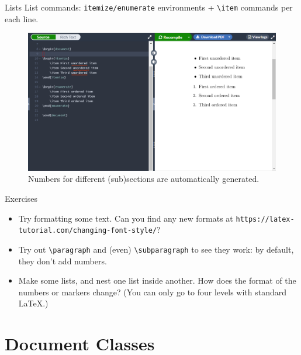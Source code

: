 \documentclass{beamer}
\begin{document}
{  \begin{frame}{Lists}
    List commands: \texttt{itemize/enumerate} environments + \texttt{\textbackslash item} commands per each line.
    \begin{figure}
      \includegraphics[width=0.9\linewidth]{day01-overleaf-06-lists.png}
      \caption{Numbers for different (sub)sections are automatically generated.}
      \label{fig:day01-overleaf-06-lists}
    \end{figure}
  \end{frame}

  \begin{frame}{Exercises}
  \begin{itemize}
    \item Try formatting some text. Can you find any new formats at \texttt{https://latex-tutorial.com/changing-font-style/}?
    \item Try out \texttt{\textbackslash paragraph} and (even) \texttt{\textbackslash subparagraph} to see they work: by default, they don’t add numbers.
    \item Make some lists, and nest one list inside another. How does the format of the numbers or markers change? (You can only go to four levels with standard \LaTeX.)
  \end{itemize}
  \end{frame}

  \section{Document Classes}

}
\end{document}
